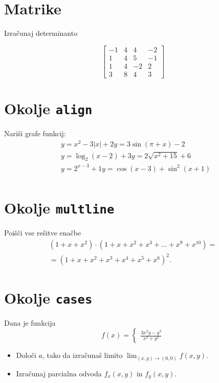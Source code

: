 \documentclass[a4paper,12pt]{article}
\begin{document}
\section*{Matrike}

Izračunaj determinanto

\[\begin{bmatrix}
   -1 & 4 & 4 & -2 \\
   1 & 4 & 5 & -1 \\
   1 & 4 & -2 & 2 \\
   3 & 8 & 4 & 3 
\end{bmatrix}\]


\section*{Okolje \texttt{align}}
Nariši grafe funkcij:
\begin{align*}
 &y = x^2 - 3|x| + 2    y = 3 \sin(\pi+x) - 2\\
& y = \log_2(x-2) + 3   y = 2 \sqrt{x^2+15} + 6\\
& y = 2^{x-3} + 1       y = \cos(x-3) + \sin^2(x+1)\\
\end{align*}

\section*{Okolje \texttt{multline}}
Poišči vse rešitve enačbe
\begin{multline*}
(1+x+x^2) \cdot (1+x+x^2+x^3+\ldots+x^9+x^{10}) =\\
=(1+x+x^2+x^3+x^4+x^5+x^6)^2.
\end{multline*}

\section*{Okolje \texttt{cases}}
Dana je funkcija
\[
f(x)=
\begin{cases}
   \frac{3x^2y-y^3}{x^2+y^2}
\end{cases}
\]
\begin{itemize}
\item Določi \(a\), tako da izračunaš limito \( \lim_{(x,y)\to(0,0)} f(x,y) \).
\item Izračunaj parcialna odvoda \(f_x(x,y)\) in \(f_y(x,y)\).
\end{itemize}
\end{document}
